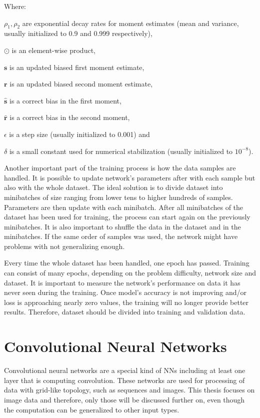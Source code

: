 \noindent Where:

$\rho_1, \rho_2$ are exponential decay rates for moment estimates (mean and variance, usually initialized to 0.9 and 0.999 respectively),

$\odot$ is an element-wise product,

$\pmb s$ is an updated biased first moment estimate,

$\pmb r$ is an updated biased second moment estimate,

$\hat{\pmb s}$ is a correct bias in the first moment,

$\hat{\pmb r}$ is a correct bias in the second moment,

$\epsilon$ is a step size (usually initialized to 0.001) and

$\delta$ is a small constant used for numerical stabilization (usually initialized to $10^{-8}$).

\vspace{0.2cm}

Another important part of the training process is how the data samples are handled. It is possible to update network's parameters after with each sample but also with the whole dataset. The ideal solution is to divide dataset into minibatches of size ranging from lower tens to higher hundreds of samples. Parameters are then update with each minibatch. After all minibatches of the dataset has been used for training, the process can start again on the previously minibatches. It is also important to shuffle the data in the dataset and in the minibatches. If the same order of samples was used, the network might have problems with not generalizing enough.

Every time the whole dataset has been handled, one epoch has passed. Training can consist of many epochs, depending on the problem difficulty, network size and dataset. It is important to measure the network's performance on data it has never seen during the training. Once model's accuracy is not improving and/or loss is approaching nearly zero values, the training will no longer provide better results. Therefore, dataset should be divided into training and validation data.

\section{\label{sec:cnn}Convolutional Neural Networks}

Convolutional neural networks are a special kind of NNs including at least one layer that is computing convolution. These networks are used for processing of data with grid-like topology, such as sequences and images. This thesis focuses on image data and therefore, only those will be discussed further on, even though the computation can be generalized to other input types.

